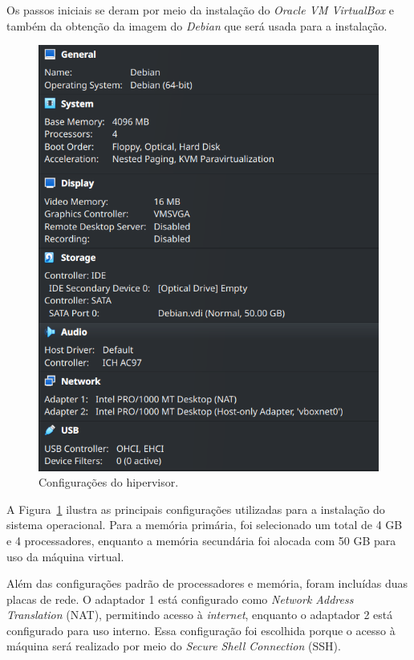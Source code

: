 \documentclass[
	12pt,				%
	oneside,   	        %
	a4paper,			%
	english,			%
	french,				%
	spanish,			%
	brazil,				%
	]{pacotes/abntex2}
\begin{document}
Os passos iniciais se deram por meio da instalação do \textit{Oracle VM VirtualBox} e também da obtenção da imagem do \textit{Debian} que será usada para a instalação. 

\begin{figure}[H]
  \centering
  \includegraphics[scale=0.7]{figuras/vm.png}
  \caption{Configurações do hipervisor.}
  \label{fig:vm}
\end{figure}

A Figura~\ref{fig:vm} ilustra as principais configurações utilizadas para a instalação do sistema operacional. Para a memória primária, foi selecionado um total de 4 GB e 4 processadores, enquanto a memória secundária foi alocada com 50 GB para uso da máquina virtual.

Além das configurações padrão de processadores e memória, foram incluídas duas placas de rede. O adaptador 1 está configurado como \textit{Network Address Translation} (NAT), permitindo acesso à \textit{internet}, enquanto o adaptador 2 está configurado para uso interno. Essa configuração foi escolhida porque o acesso à máquina será realizado por meio do \textit{Secure Shell Connection} (SSH).
\end{document}
